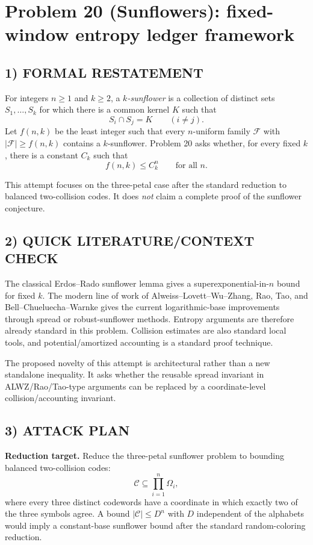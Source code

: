 \section{Problem 20 (Sunflowers): fixed-window entropy ledger framework}

\subsection{1) FORMAL RESTATEMENT}

For integers $n\ge 1$ and $k\ge 2$, a \emph{$k$-sunflower} is a collection of
distinct sets $S_1,\ldots,S_k$ for which there is a common kernel $K$ such that
\[
  S_i\cap S_j=K\qquad (i\ne j).
\]
Let $f(n,k)$ be the least integer such that every $n$-uniform family
$\mathcal F$ with $|\mathcal F|\ge f(n,k)$ contains a $k$-sunflower.
Problem 20 asks whether, for every fixed $k$, there is a constant $C_k$ such
that
\[
  f(n,k)\le C_k^n\qquad\text{for all }n.
\]

This attempt focuses on the three-petal case after the standard reduction to
balanced two-collision codes.  It does \emph{not} claim a complete proof of the
sunflower conjecture.

\subsection{2) QUICK LITERATURE/CONTEXT CHECK}

The classical Erdos--Rado sunflower lemma gives a superexponential-in-$n$
bound for fixed $k$.  The modern line of work of Alweiss--Lovett--Wu--Zhang,
Rao, Tao, and Bell--Chueluecha--Warnke gives the current logarithmic-base
improvements through spread or robust-sunflower methods.  Entropy arguments
are therefore already standard in this problem.  Collision estimates are also
standard local tools, and potential/amortized accounting is a standard proof
technique.

The proposed novelty of this attempt is architectural rather than a new
standalone inequality.  It asks whether the reusable spread invariant in
ALWZ/Rao/Tao-type arguments can be replaced by a coordinate-level
collision/accounting invariant.

\subsection{3) ATTACK PLAN}

\textbf{Reduction target.}
Reduce the three-petal sunflower problem to bounding balanced two-collision
codes:
\[
  \mathcal C\subseteq \prod_{i=1}^n \Omega_i,
\]
where every three distinct codewords have a coordinate in which exactly two of
the three symbols agree.  A bound $|\mathcal C|\le D^n$ with $D$ independent
of the alphabets would imply a constant-base sunflower bound after the
standard random-coloring reduction.

